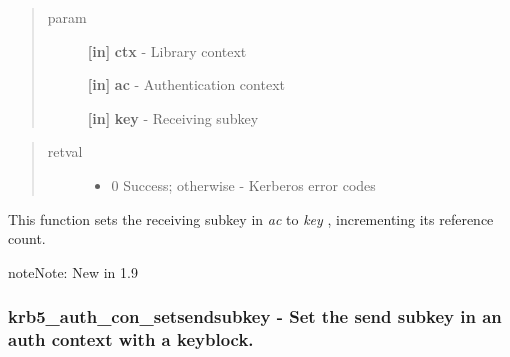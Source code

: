\documentclass[letterpaper,10pt,english]{sphinxmanual}
\begin{document}
\begin{quote}\begin{description}
\item[{param}] \leavevmode
\textbf{{[}in{]}} \textbf{ctx} - Library context

\textbf{{[}in{]}} \textbf{ac} - Authentication context

\textbf{{[}in{]}} \textbf{key} - Receiving subkey

\end{description}\end{quote}
\begin{quote}\begin{description}
\item[{retval}] \leavevmode\begin{itemize}
\item {} 
0   Success; otherwise - Kerberos error codes

\end{itemize}

\end{description}\end{quote}

This function sets the receiving subkey in \emph{ac} to \emph{key} , incrementing its reference count.

\begin{notice}{note}{Note:}
New in 1.9
\end{notice}


\subsubsection{krb5\_auth\_con\_setsendsubkey -  Set the send subkey in an auth context with a keyblock.}
\label{appdev/refs/api/krb5_auth_con_setsendsubkey::doc}\label{appdev/refs/api/krb5_auth_con_setsendsubkey:krb5-auth-con-setsendsubkey-set-the-send-subkey-in-an-auth-context-with-a-keyblock}

\begin{fulllineitems}
\label{appdev/refs/api/krb5_auth_con_setsendsubkey:krb5_auth_con_setsendsubkey}
\end{fulllineitems}
\end{document}
